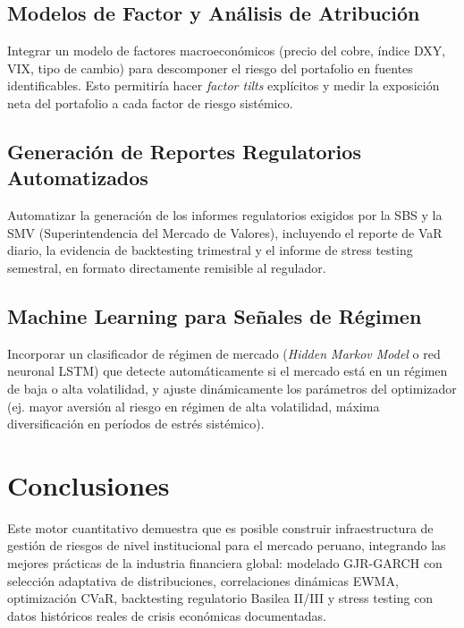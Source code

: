 \documentclass[11pt,a4paper]{article}
\begin{document}
\subsection{Modelos de Factor y Análisis de Atribución}

Integrar un modelo de factores macroeconómicos (precio del cobre, índice DXY, VIX,
tipo de cambio) para descomponer el riesgo del portafolio en fuentes identificables.
Esto permitiría hacer \textit{factor tilts} explícitos y medir la exposición neta
del portafolio a cada factor de riesgo sistémico.

\subsection{Generación de Reportes Regulatorios Automatizados}

Automatizar la generación de los informes regulatorios exigidos por la SBS y la
SMV (Superintendencia del Mercado de Valores), incluyendo el reporte de VaR diario,
la evidencia de backtesting trimestral y el informe de stress testing semestral,
en formato directamente remisible al regulador.

\subsection{Machine Learning para Señales de Régimen}

Incorporar un clasificador de régimen de mercado (\textit{Hidden Markov Model} o red
neuronal LSTM) que detecte automáticamente si el mercado está en un régimen de baja
o alta volatilidad, y ajuste dinámicamente los parámetros del optimizador (ej.
mayor aversión al riesgo en régimen de alta volatilidad, máxima diversificación en
períodos de estrés sistémico).

\section{Conclusiones}

Este motor cuantitativo demuestra que es posible construir infraestructura de gestión
de riesgos de nivel institucional para el mercado peruano, integrando las mejores
prácticas de la industria financiera global: modelado GJR-GARCH con selección adaptativa
de distribuciones, correlaciones dinámicas EWMA, optimización CVaR, backtesting regulatorio
Basilea II/III y stress testing con datos históricos reales de crisis económicas documentadas.
\end{document}
